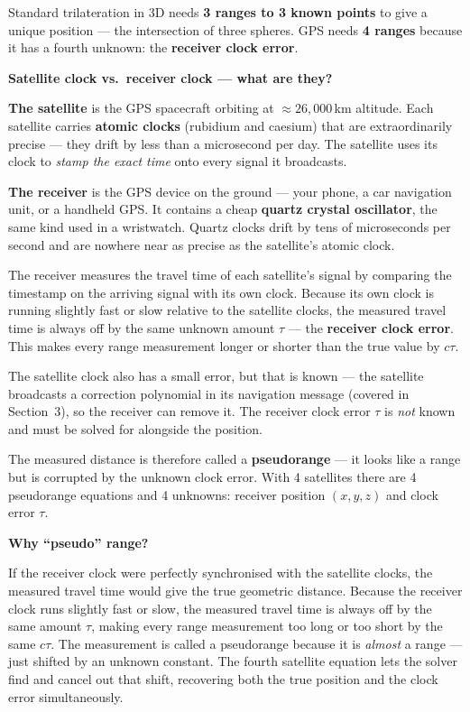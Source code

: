 \documentclass[12pt, a4paper]{article}
\begin{document}
Standard trilateration in 3D needs \textbf{3 ranges to 3 known points}
to give a unique position --- the intersection of three spheres.
GPS needs \textbf{4 ranges} because it has a fourth unknown: the
\textbf{receiver clock error}.

\begin{notebox}
  \textbf{Satellite clock vs.\ receiver clock --- what are they?}

  \textbf{The satellite} is the GPS spacecraft orbiting at
  $\approx 26{,}000$\,km altitude.
  Each satellite carries \textbf{atomic clocks} (rubidium and caesium)
  that are extraordinarily precise --- they drift by less than a
  microsecond per day.
  The satellite uses its clock to \emph{stamp the exact time} onto
  every signal it broadcasts.

  \textbf{The receiver} is the GPS device on the ground --- your phone,
  a car navigation unit, or a handheld GPS.
  It contains a cheap \textbf{quartz crystal oscillator}, the same
  kind used in a wristwatch.
  Quartz clocks drift by tens of microseconds per second and are
  nowhere near as precise as the satellite's atomic clock.

  The receiver measures the travel time of each satellite's signal by
  comparing the timestamp on the arriving signal with its own clock.
  Because its own clock is running slightly fast or slow relative to
  the satellite clocks, the measured travel time is always off by the
  same unknown amount $\tau$ --- the \textbf{receiver clock error}.
  This makes every range measurement longer or shorter than the true
  value by $c\tau$.

  The satellite clock also has a small error, but that is known ---
  the satellite broadcasts a correction polynomial in its navigation
  message (covered in Section~3), so the receiver can remove it.
  The receiver clock error $\tau$ is \emph{not} known and must be
  solved for alongside the position.
\end{notebox}

The measured distance is therefore called a \textbf{pseudorange}
--- it looks like a range but is corrupted by the unknown clock error.
With 4 satellites there are 4 pseudorange equations and 4 unknowns:
receiver position $(x, y, z)$ and clock error $\tau$.

\begin{notebox}
  \textbf{Why ``pseudo'' range?}

  If the receiver clock were perfectly synchronised with the satellite
  clocks, the measured travel time would give the true geometric
  distance.
  Because the receiver clock runs slightly fast or slow, the measured
  travel time is always off by the same amount $\tau$, making every
  range measurement too long or too short by the same $c\tau$.
  The measurement is called a pseudorange because it is
  \emph{almost} a range --- just shifted by an unknown constant.
  The fourth satellite equation lets the solver find and cancel out
  that shift, recovering both the true position and the clock error
  simultaneously.
\end{notebox}
\end{document}
